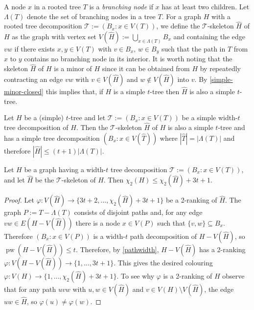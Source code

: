 \documentclass[kpfonts]{patmorin}
\DeclareMathOperator{\pw}{pw}
\newcommand{\trn}{\chi_2}
\theoremstyle{named}
\begin{document}
A node $x$ in a rooted tree $T$ is a \emph{branching node} if $x$ has at least two children.  Let $\Lambda(T)$ denote the set of branching nodes in a tree $T$. For a graph $H$ with a rooted tree decomposition $\mathcal{T}:=(B_x:x\in V(T))$, we define the $\mathcal{T}$-skeleton $\hat{H}$ of $H$ as the graph with vertex set $V(\hat{H}):=\bigcup_{x\in \Lambda(T)} B_x$ and containing the edge $vw$ if there exists $x,y\in V(T)$ with $v\in B_x$, $w\in B_y$ such that the path in $T$ from $x$ to $y$ contains no branching node in its interior.  It is worth noting that the skeleton $\hat{H}$ of $H$ is a minor of $H$ since it can be obtained from $H$ by repeatedly contracting an edge $vw$ with $v\in V(\hat{H})$ and $w\not\in V(\hat{H})$ into $v$. By \cref{simple-minor-closed} this implies that, if $H$ is a simple $t$-tree then $\hat{H}$ is also a simple $t$-tree.

\begin{obs}\label{skeleton-size}
    Let $H$ be a (simple) $t$-tree and let $\mathcal{T}:=(B_x:x\in V(T))$ be a simple width-$t$ tree decomposition of $H$.  Then the $\mathcal{T}$-skeleton $\hat{H}$ of $H$ is also a simple $t$-tree and has a simple tree decomposition $(B_x:x\in V(\hat{T}))$ where $|\hat{T}|=|\Lambda(T)|$ and therefore $|\hat{H}|\le (t+1)|\Lambda(T)|$.
\end{obs}

\begin{lem}\label{skeleton-colour}
    Let $H$ be a graph having a width-$t$ tree decomposition $\mathcal{T}:=(B_x:x\in V(T))$, and let $\hat{H}$ be the $\mathcal{T}$-skeleton of $H$.  Then $\trn(H)\le \trn(\hat{H}) + 3t+1$.
\end{lem}

\begin{proof}
    Let $\varphi:V(\hat{H})\to \{3t+2,\ldots,\trn(\hat{H})+3t+1\}$ be a 2-ranking of $\hat{H}$. The graph $P:=T-\Lambda(T)$ consists of disjoint paths and, for any edge $vw\in E(H-V(\hat{H}))$ there is a node $x\in V(P)$ such that $\{v,w\}\subseteq B_x$.  Therefore $(B_x:x\in V(P))$ is a width-$t$ path decomposition of $H-V(\hat{H})$, so $\pw(H-V(\hat{H}))\le t$.  Therefore, by \cref{pathwidth}, $H-V(\hat{H})$ has a 2-ranking $\varphi:V(H-V(\hat{H}))\to\{1,\ldots,3t+1\}$.  This gives the desired colouring $\varphi: V(H)\to\{1,\ldots,\trn(\hat{H})+3t+1\}$.  To see why $\varphi$ is a 2-ranking of $H$ observe that for any path $uvw$ with $u,w\in V(\hat{H})$ and $v\in V(H)\setminus V(\hat{H})$, the edge $uw\in\hat{H}$, so $\varphi(u)\neq\varphi(w)$.
\end{proof}
\end{document}
